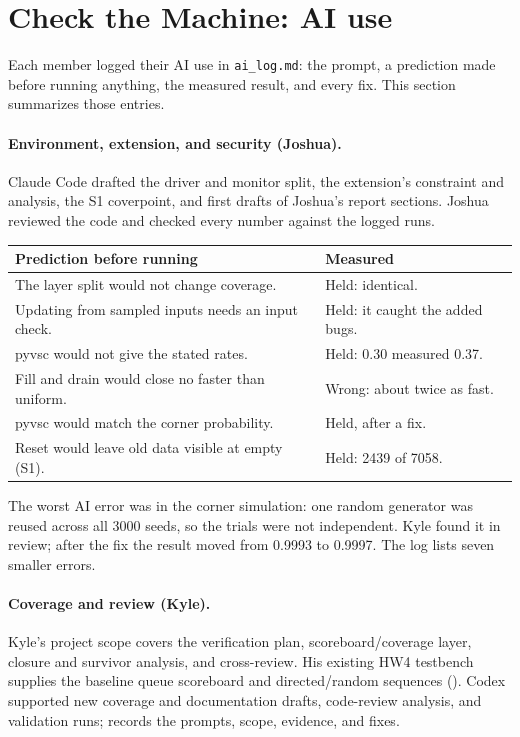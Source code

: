 \section{Check the Machine: AI use}
\label{sec:ai}

Each member logged their AI use in \texttt{ai\_log.md}: the prompt, a
prediction made before running anything, the measured result, and every fix.
This section summarizes those entries.

\paragraph{Environment, extension, and security (Joshua).} Claude Code
drafted the driver and monitor split, the extension's constraint and analysis,
the S1 coverpoint, and first drafts of Joshua's report sections. Joshua
reviewed the code and checked every number against the logged runs.
\begin{center}
\begin{tabular}{@{}>{\raggedright\arraybackslash}p{}>{\raggedright\arraybackslash}p{}@{}}
\toprule
\textbf{Prediction before running} & \textbf{Measured} \\
\midrule
The layer split would not change coverage. & Held: identical. \\
Updating from sampled inputs needs an input check. & Held: it caught the added bugs. \\
pyvsc would not give the stated rates. & Held: 0.30 measured 0.37. \\
Fill and drain would close no faster than uniform. & Wrong: about twice as fast. \\
pyvsc would match the corner probability. & Held, after a fix. \\
Reset would leave old data visible at empty (S1). & Held: 2439 of 7058. \\
\bottomrule
\end{tabular}
\end{center}
\noindent
The worst AI error was in the corner simulation: one random generator was
reused across all 3000 seeds, so the trials were not independent. Kyle found
it in review; after the fix the result moved from 0.9993 to 0.9997. The log
lists seven smaller errors.

\paragraph{Coverage and review (Kyle).} Kyle's project scope covers the
verification plan, scoreboard/coverage layer, closure and survivor analysis,
and cross-review. His existing HW4 testbench supplies the baseline queue
scoreboard and directed/random sequences (). Codex supported
new coverage and documentation drafts, code-review analysis, and validation
runs;  records the prompts, scope, evidence, and fixes.

